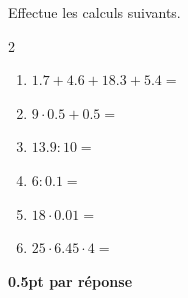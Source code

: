 
\question[3]
Effectue les calculs suivants.	

\vspace{10pt}
\setlength{\columnsep}{50pt}
\begin{multicols}{2}
\begin{enumerate}[leftmargin=*,align=parleft, label=\alph*), itemsep=15pt]
\item $1.7 + 4.6 + 18.3 + 5.4 =$ 
\item $9 \cdot 0.5 + 0.5 =$ 
\item $13.9 : 10 =$ 
\item $6 : 0.1 =$ 
\item $18 \cdot 0.01 =$ 
\item $25 \cdot 6.45 \cdot 4 =$ 
\end{enumerate}
\end{multicols}
\setlength{\columnsep}{10pt}

\begin{solution}[0pt]
\textbf{0.5pt par réponse}
\end{solution}